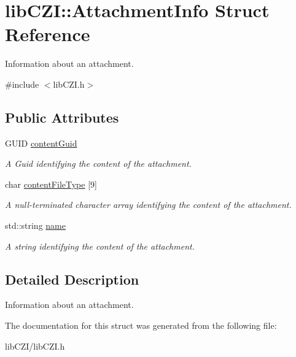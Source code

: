\hypertarget{structlib_c_z_i_1_1_attachment_info}{}\section{lib\+C\+ZI\+:\+:Attachment\+Info Struct Reference}
\label{structlib_c_z_i_1_1_attachment_info}


Information about an attachment.  




{\ttfamily \#include $<$lib\+C\+Z\+I.\+h$>$}

\subsection*{Public Attributes}
\begin{DoxyCompactItemize}
\item 
\mbox{\label{structlib_c_z_i_1_1_attachment_info_a7be40455831774e65cd394592af97220}} 
G\+U\+ID \hyperlink{structlib_c_z_i_1_1_attachment_info_a7be40455831774e65cd394592af97220}{content\+Guid}
\begin{DoxyCompactList}\small\item\em A Guid identifying the content of the attachment. \end{DoxyCompactList}\item 
\mbox{\label{structlib_c_z_i_1_1_attachment_info_a0cd022f5e1f564d410165faeb72eadbb}} 
char \hyperlink{structlib_c_z_i_1_1_attachment_info_a0cd022f5e1f564d410165faeb72eadbb}{content\+File\+Type} \mbox{[}9\mbox{]}
\begin{DoxyCompactList}\small\item\em A null-\/terminated character array identifying the content of the attachment. \end{DoxyCompactList}\item 
\mbox{\label{structlib_c_z_i_1_1_attachment_info_a0e68d0e359ff6dc8ae54e39267486a43}} 
std\+::string \hyperlink{structlib_c_z_i_1_1_attachment_info_a0e68d0e359ff6dc8ae54e39267486a43}{name}
\begin{DoxyCompactList}\small\item\em A string identifying the content of the attachment. \end{DoxyCompactList}\end{DoxyCompactItemize}


\subsection{Detailed Description}
Information about an attachment. 

The documentation for this struct was generated from the following file\+:\begin{DoxyCompactItemize}
\item 
lib\+C\+Z\+I/lib\+C\+Z\+I.\+h\end{DoxyCompactItemize}
